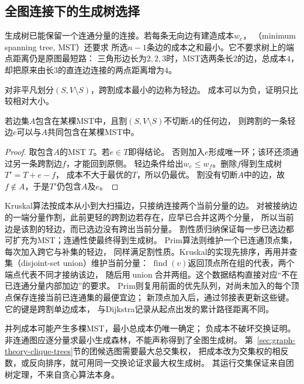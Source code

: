 \subsection{全图连接下的生成树选择}
\label{sec:graph-theory-minimum-spanning-tree}

生成树已能保留一个连通分量的连接。若每条无向边有建造成本\(w_e\)，
（minimum spanning tree, MST）还要求
所选\(n-1\)条边的成本之和最小。它不要求树上的端点距离仍是原图最短路：
三角形边长为\(2,2,3\)时，MST选两条长\(2\)的边，总成本\(4\)，
却把原来由长\(3\)的直连边连接的两点距离增为\(4\)。

对非平凡划分\((S,V\setminus S)\)，跨割成本最小的边称为轻边。
成本可以为负，证明只比较相对大小。

\begin{lemma}[最小生成树的割性质]
  \label{lem:graph-theory-mst-cut-property}
  若边集\(A\)包含在某棵MST中，且割\((S,V\setminus S)\)不切断\(A\)的任何边，
  则跨割的一条轻边\(e\)可以与\(A\)共同包含在某棵MST中。
\end{lemma}

\begin{proof}
取包含\(A\)的MST \(T\)。若\(e\in T\)即得结论。
否则加入\(e\)形成唯一环；该环还须通过另一条跨割边\(f\)，才能回到原侧。
轻边条件给出\(w_e\leq w_f\)。删除\(f\)得到生成树\(T'=T+e-f\)，
成本不大于最优的\(T\)，所以仍最优。
割没有切断\(A\)中的边，故\(f\notin A\)，于是\(T'\)仍包含\(A\)及\(e\)。
\end{proof}

Kruskal算法按成本从小到大扫描边，只接纳连接两个当前分量的边。
对被接纳边的一端分量作割，此前更轻的跨割边若存在，应早已合并这两个分量，
所以当前边是该割的轻边，而已选边没有跨出当前分量。
割性质归纳保证每一步已选边都可扩充为MST；连通性使最终得到生成树。
Prim算法则维护一个已连通顶点集，每次加入跨它与补集的轻边，
同样满足割性质。Kruskal的实现先排序，再用并查集（disjoint-set union）维护当前分量：
\(\operatorname{find}(v)\)返回顶点所在组的代表，两个端点代表不同才接纳该边，
随后用\(\operatorname{union}\)合并两组。这个数据结构直接对应“不在已连通分量内部加边”的要求。
Prim则复用前面的优先队列，对尚未加入的每个顶点保存连接当前已连通集的最便宜边；
新顶点加入后，通过邻接表更新这些键。它的键是跨割单边成本，
与Dijkstra记录从起点出发的累计路径距离不同。

并列成本可能产生多棵MST，最小总成本仍唯一确定；
负成本不破坏交换证明。非连通图应逐分量求最小生成森林，不能声称得到了全图生成树。
第~\ref{sec:graph-theory-clique-trees}节的团候选图需要最大总交集权，
把成本改为交集权的相反数，或反向排序，就可用同一交换论证求最大权生成树。
其运行交集保证来自团树定理，不来自贪心算法本身。

